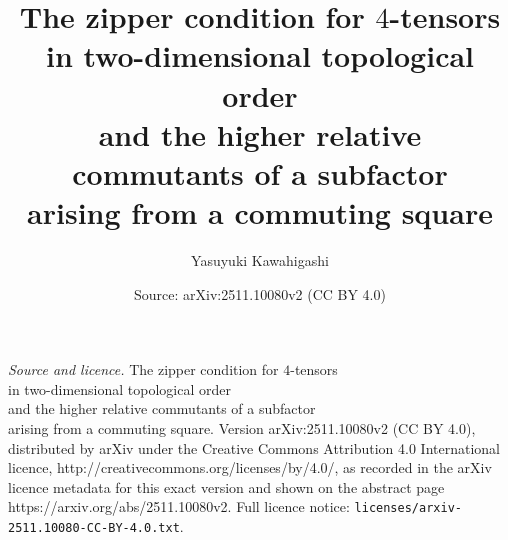 \documentclass[10pt,a4paper]{amsart}
\title{The zipper condition for $4$-tensors\\ in two-dimensional topological order\\ and the higher relative commutants of a subfactor\\ arising from a commuting square}
\author{Yasuyuki Kawahigashi}
\date{Source: arXiv:2511.10080v2 (CC BY 4.0)}
\begin{document}
\maketitle

\noindent\emph{Source and licence.} The zipper condition for $4$-tensors\\ in two-dimensional topological order\\ and the higher relative commutants of a subfactor\\ arising from a commuting square. Version arXiv:2511.10080v2 (CC BY 4.0), distributed by arXiv under the Creative Commons Attribution 4.0 International licence, http://creativecommons.org/licenses/by/4.0/, as recorded in the arXiv licence metadata for this exact version and shown on the abstract page https://arxiv.org/abs/2511.10080v2. Full licence notice: \texttt{licenses/arxiv-2511.10080-CC-BY-4.0.txt}.\par\smallskip
\end{document}

